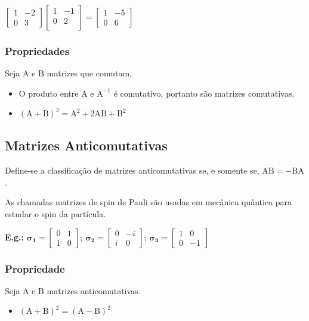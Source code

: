 \documentclass[a4paper,12pt]{article}
\begin{document}
 $ \begin{bmatrix}
1 & -2 \\
0 & 3
\end{bmatrix} \begin{bmatrix}
1 & -1 \\
0 & 2 \\
\end{bmatrix} = \begin{bmatrix}
1 & -5 \\
0 & 6
\end{bmatrix}$

\subsubsection{Propriedades}
Seja $ \text{A} $ e $ \text{B} $ matrizes que comutam.
\begin{itemize}
    \item O produto entre $ \text{A} $ e $ \text{A}^{-1} $ é comutativo, portanto são matrizes comutativas.
    
    \item $ (\text{A} + \text{B})^{2} = \text{A}^{2} + 2 \text{A} \text{B} + \text{B}^{2}$
    
\end{itemize}

\subsection{Matrizes Anticomutativas}
Define-se a classificação de matrizes anticomutativas se, e somente se, $ \text{A} \text{B} = - \text{B} \text{A} $.

As chamadas matrizes de spin de Pauli são usadas em mecânica quântica para estudar o spin da partícula.

\textbf{E.g.:} $ \boldsymbol{\sigma_{1}} = \begin{bmatrix}
0 & 1\\
1 & 0
\end{bmatrix} $; $ \boldsymbol{\sigma_{2}} = \begin{bmatrix}
0 & -i\\
i & 0
\end{bmatrix} $; $ \boldsymbol{\sigma_{3}} = \begin{bmatrix}
1 & 0\\
0 & -1
\end{bmatrix} $

\subsubsection{Propriedade}
Seja $ \text{A} $ e $ \text{B} $ matrizes anticomutativas.
\begin{itemize}
    \item $ (\text{A} + \text{B})^{2} = (\text{A} - \text{B} )^{2} $
\end{itemize}
\end{document}
